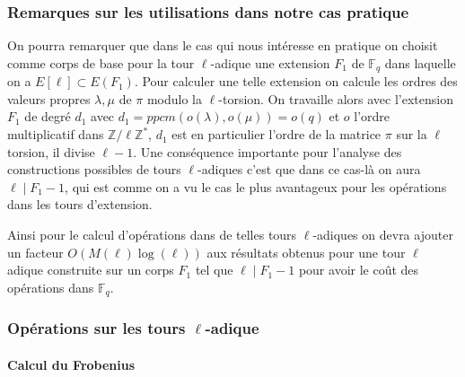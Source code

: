 \documentclass[10pt,a4paper]{book}
\theoremstyle{plain}
\theoremstyle{definition}
\theoremstyle{definition}
\theoremstyle{definition}
\theoremstyle{definition}
\theoremstyle{remark}
\theoremstyle{remark}
\begin{document}
\subsubsection{Remarques sur les utilisations dans notre cas pratique}
On pourra remarquer que dans le cas qui nous intéresse en pratique on choisit comme corps de base pour la tour $\ell$-adique une extension $F_1$ de $\mathbb{F}_q$ dans laquelle on a $E[\ell] \subset E(F_1)$. Pour calculer une telle extension on calcule les ordres des valeurs propres $\lambda, \mu$ de $\pi$ modulo la $\ell$-torsion. On travaille alors avec l'extension $F_1$ de degré $d_1$ avec $d_1=ppcm(o(\lambda),o(\mu))=o(q)$ et $o$ l'ordre multiplicatif dans $\mathbb{Z}/\ell\mathbb{Z}^*$, $d_1$ est en particulier l'ordre de la matrice $\pi$ sur la $\ell$ torsion, il divise $\ell-1$. Une conséquence importante pour l'analyse des constructions possibles de tours $\ell$-adiques c'est que dans ce cas-là on aura $\ell \mid F_1-1$, qui est comme on a vu le cas le plus avantageux pour les opérations dans les tours d'extension. 

Ainsi pour le calcul d'opérations dans de telles tours $\ell$-adiques on devra ajouter un facteur $O(M(\ell)\log(\ell))$ aux résultats obtenus pour une tour $\ell$ adique construite sur un corps $F_1$ tel que $\ell \mid F_1-1$ pour avoir le coût des opérations dans $\mathbb{F}_q$.


\subsubsection{Opérations sur les tours $\ell$-adique}


\paragraph{Calcul du Frobenius}




\end{document}
